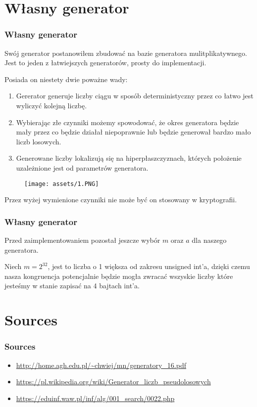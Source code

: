 \documentclass[9pt]{beamer}
\begin{document}
\section{Własny generator}
\begin{frame}
  \frametitle{Własny generator}
    Swój generator postanowiłem zbudować na bazie generatora mulitplikatywnego. Jest to jeden z łatwiejszych generatorów, prosty do implementacji. 
    
    Posiada on niestety dwie poważne wady:
    \begin{enumerate}
      \item Gererator generuje liczby ciągu w sposób deterministyczny przez co łatwo jest wyliczyć kolejną liczbę.
      \item Wybierając złe czynniki możemy spowodować, że okres generatora będzie mały przez co będzie działał niepoprawnie lub będzie generował bardzo mało liczb losowych.
      \item Generowane liczby lokalizują się na hiperpłaszczyznach, których położenie uzależnione jest od parametrów generatora.
    \end{enumerate} 
    \begin{figure}[h]
      \begin{center}
      \texttt{[image: assets/1.PNG]}
      \end{center}
      \end{figure}
    Przez wyżej wymienione czynniki nie może być on stosowany w kryptografii.
\end{frame}
\begin{frame}
  \frametitle{Własny generator}
  Przed zaimplementowaniem pozostał jeszcze wybór $m$ oraz $a$ dla naszego generatora.

  Niech $m=2^{32}$, jest to liczba o 1 większa od zakresu unsigned int'a, dzięki czemu nasza kongruencja potencjalnie będzie mogła zwracać wszyskie liczby które jesteśmy w stanie zapisać na 4 bajtach int'a. 
\end{frame}







\section{Sources}
\begin{frame}
  \frametitle{Sources}
  \begin{itemize}
    \item \url{http://home.agh.edu.pl/~chwiej/mn/generatory_16.pdf}
    \item \url{https://pl.wikipedia.org/wiki/Generator_liczb_pseudolosowych}
    \item \url{https://eduinf.waw.pl/inf/alg/001_search/0022.php}
  \end{itemize}
\end{frame}
\end{document}
